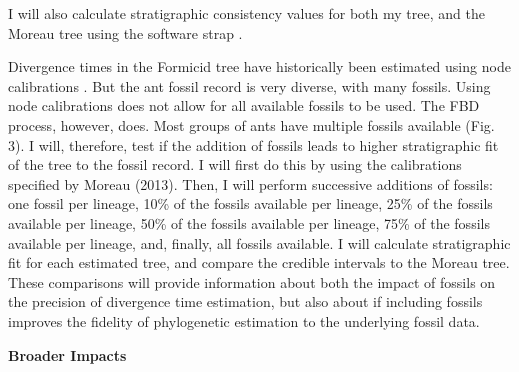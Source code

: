\documentclass[12pt]{article}
\begin{document}
I will also calculate stratigraphic consistency values for both my tree, and the Moreau tree using the software strap \cite{bell2011}. \par
Divergence times in the Formicid tree have historically been estimated using node calibrations \cite{Moreau2006, Moreau2013}.
But the ant fossil record is very diverse, with many fossils.
Using node calibrations does not allow for all available fossils to be used.
The FBD process, however, does.
Most groups of ants have multiple fossils available (Fig. 3).
I will, therefore, test if the addition of fossils leads to higher stratigraphic fit of the tree to the fossil record.
I will first do this by using the calibrations specified by Moreau (2013).
Then, I will perform successive additions of fossils: one fossil per lineage, 10\% of the fossils available per lineage, 25\% of the fossils available per lineage, 50\% of the fossils available per lineage, 75\% of the fossils available per lineage, and, finally, all fossils available. 
I will calculate stratigraphic fit for each estimated tree, and compare the credible intervals to the Moreau tree. 
These comparisons will provide information about both the impact of fossils on the precision of divergence time estimation, but also about if including fossils improves the fidelity of phylogenetic estimation to the underlying fossil data. 
\par

\textbf{Broader Impacts}
\end{document}

